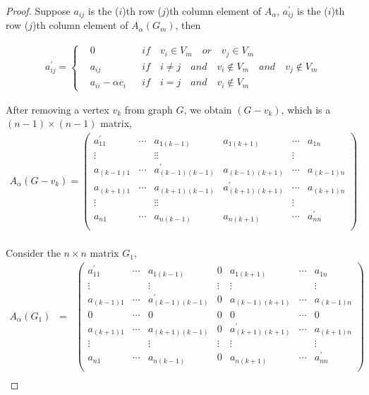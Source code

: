 \documentclass[amsthm]{elsart}
\begin{document}
\begin{proof}
Suppose $a_{ij}$ is the ($i$)th row ($j$)th column element of $A_\alpha$,  $a_{ij}^{\prime}$ is the ($i$)th row ($j$)th column element of $A_\alpha(G_m)$, then

\begin{eqnarray*}
 a_{ij}^{\prime} =
\left\{
\begin{aligned}
&0    && if \quad v_i \in V_m \quad or \quad v_j \in V_m \\
&a_{ij}    && if \quad i \neq j  \quad and \quad v_i \notin V_m  \quad and \quad v_j \notin V_m \\
&a_{ii} - \alpha c_i    && if \quad i = j \quad and \quad v_i \notin V_m
\end{aligned}
\right.
\end{eqnarray*}

After removing a vertex $v_k$ from graph $G$, we obtain $(G - v_k)$,
 which is a $(n - 1) \times (n - 1)$ matrix, \\

\begin{eqnarray*}
A_\alpha(G - v_k) =
\begin{pmatrix}
a_{11}^{\prime} & \cdots & a_{1(k-1)} & a_{1(k+1)} & \cdots & a_{1n}\\
\vdots & {} & \vdots \vdots & {} & \vdots \\
a_{(k-1)1} & \cdots & a_{(k-1)(k-1)}^{\prime} & a_{(k-1)(k+1)} & \cdots & a_{(k-1)n}\\
a_{(k+1)1} & \cdots & a_{(k+1)(k-1)} & a_{(k+1)(k+1)}^{\prime} & \cdots & a_{(k+1)n}\\
\vdots & {} & \vdots \vdots & {} & \vdots \\
a_{n1} & \cdots & a_{n(k-1)} & a_{n(k+1)} & \cdots & a_{nn}^{\prime}\\
\end{pmatrix} \\
\end{eqnarray*}

Consider the $n \times n$ matrix $G_1$, \\
\begin{eqnarray*}
A_\alpha(G_1) \;\;=\;\;
\begin{pmatrix}
a_{11}^{\prime} & \cdots & a_{1(k-1)} & 0 & a_{1(k+1)} & \cdots & a_{1n} \\
\vdots & {} & \vdots & \vdots & \vdots & {} & \vdots \\
a_{(k-1)1} & \cdots & a_{(k-1)(k-1)}^{\prime} & 0 & a_{(k-1)(k+1)} & \cdots & a_{(k-1)n} \\
0 & \cdots & 0 & 0 & 0 & \cdots & 0 \\
a_{(k+1)1} & \cdots & a_{(k+1)(k-1)} & 0 & a_{(k+1)(k+1)}^{\prime} & \cdots & a_{(k+1)n} \\
\vdots & {} & \vdots & \vdots & \vdots & {} & \vdots \\
a_{n1} & \cdots & a_{n(k-1)} & 0 & a_{n(k+1)} & \cdots & a_{nn}^{\prime} \\
\end{pmatrix} \\
\end{eqnarray*}


\end{proof}
\end{document}
